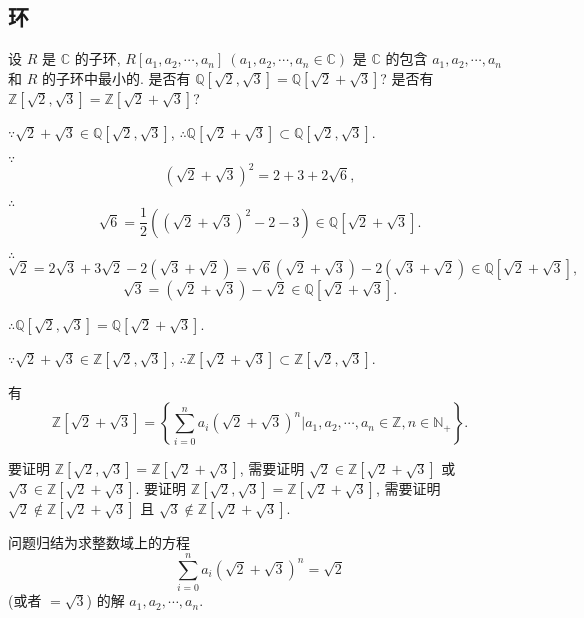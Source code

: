 \documentclass[color=black,device=normal,lang=cn,mode=geye]{elegantnote}
\begin{document}
\subsection{环}
\begin{exercisec}[5.3.3]
    设 $R$ 是 $\mathbb{C}$ 的子环, $R[a_1,a_2,\cdots,a_n]\ (a_1,a_2,\cdots,a_n\in\mathbb{C})$ 是 $\mathbb{C}$ 的包含 $a_1,a_2,\cdots,a_n$ 和 $R$ 的子环中最小的. 是否有 $\mathbb{Q}[\sqrt{2},\sqrt{3}]=\mathbb{Q}[\sqrt{2}+\sqrt{3}]$? 是否有 $\mathbb{Z}[\sqrt{2},\sqrt{3}]=\mathbb{Z}[\sqrt{2}+\sqrt{3}]$?
\end{exercisec}
\begin{solution}
    $\because\sqrt{2}+\sqrt{3}\in\mathbb{Q}[\sqrt{2},\sqrt{3}]$, $\therefore\mathbb{Q}[\sqrt{2}+\sqrt{3}]\subset\mathbb{Q}[\sqrt{2},\sqrt{3}]$.

    $\because$
    \[(\sqrt{2}+\sqrt{3})^2=2+3+2\sqrt{6},\]

    $\therefore$
    \[\sqrt{6}=\dfrac{1}{2}((\sqrt{2}+\sqrt{3})^2-2-3)\in\mathbb{Q}[\sqrt{2}+\sqrt{3}].\]

    $\therefore$
    \[\sqrt{2}=2\sqrt{3}+3\sqrt{2}-2(\sqrt{3}+\sqrt{2})=\sqrt{6}(\sqrt{2}+\sqrt{3})-2(\sqrt{3}+\sqrt{2})\in\mathbb{Q}[\sqrt{2}+\sqrt{3}],\]
    \[\sqrt{3}=(\sqrt{2}+\sqrt{3})-\sqrt{2}\in\mathbb{Q}[\sqrt{2}+\sqrt{3}].\]

    $\therefore\mathbb{Q}[\sqrt{2},\sqrt{3}]=\mathbb{Q}[\sqrt{2}+\sqrt{3}]$.

    $\because\sqrt{2}+\sqrt{3}\in\mathbb{Z}[\sqrt{2},\sqrt{3}]$, $\therefore\mathbb{Z}[\sqrt{2}+\sqrt{3}]\subset\mathbb{Z}[\sqrt{2},\sqrt{3}]$.

    有
    \[\mathbb{Z}[\sqrt{2}+\sqrt{3}]=\left\{\sum\limits_{i=0}^na_i(\sqrt{2}+\sqrt{3})^n\bigg|a_1,a_2,\cdots,a_n\in\mathbb{Z},n\in\mathbb{N}_+\right\}.\]

    要证明 $\mathbb{Z}[\sqrt{2},\sqrt{3}]=\mathbb{Z}[\sqrt{2}+\sqrt{3}]$, 需要证明 $\sqrt{2}\in\mathbb{Z}[\sqrt{2}+\sqrt{3}]$ 或 $\sqrt{3}\in\mathbb{Z}[\sqrt{2}+\sqrt{3}]$. 要证明 $\mathbb{Z}[\sqrt{2},\sqrt{3}]=\mathbb{Z}[\sqrt{2}+\sqrt{3}]$, 需要证明 $\sqrt{2}\notin\mathbb{Z}[\sqrt{2}+\sqrt{3}]$ 且 $\sqrt{3}\notin\mathbb{Z}[\sqrt{2}+\sqrt{3}]$.
    
    问题归结为求整数域上的方程
    \begin{equation}\label{eq5.1}
        \sum\limits_{i=0}^na_i(\sqrt{2}+\sqrt{3})^n=\sqrt{2}
    \end{equation}
    (或者 $=\sqrt{3}$) 的解 $a_1,a_2,\cdots,a_n$.


\end{solution}
\end{document}
